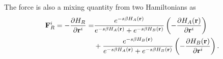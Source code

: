 
The force is also a mixing quantity from two Hamiltonians as
\begin{align}
	\mathbf{F}_R^i=-\frac{\partial H_R}{\partial \mathbf{r}^i}=&\frac{e^{-s\beta H_A(\mathbf{r})}}{e^{-s\beta H_A(\mathbf{r})}+e^{-s\beta H_B(\mathbf{r})}}\left(-\frac{\partial H_A(\mathbf{r})}{\partial \mathbf{r}^i}\right)\notag\\
	&+\frac{e^{-s\beta H_B(\mathbf{r})}}{e^{-s\beta H_A(\mathbf{r})}+e^{-s\beta H_B(\mathbf{r})}}\left(-\frac{\partial H_B(\mathbf{r})}{\partial \mathbf{r}^i}\right).
\end{align}
